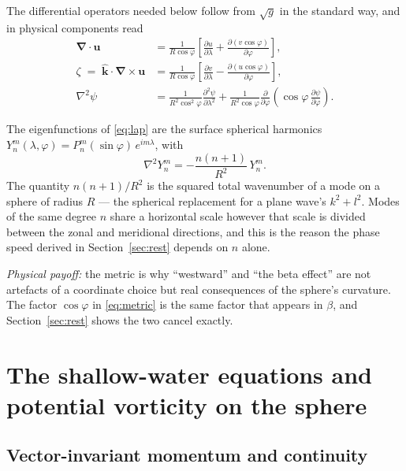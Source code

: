 \documentclass[11pt,a4paper]{article}
\newcommand{\uvec}{\boldsymbol{u}}
\newcommand{\kvec}{\hat{\boldsymbol{k}}}
\newcommand{\grad}{\boldsymbol{\nabla}}
\begin{document}
The differential operators needed below follow from $\sqrt{g}$ in the standard
way, and in physical components read
%
\begin{align}
\grad\!\cdot\uvec &= \frac{1}{R\cos\varphi}
   \left[\frac{\partial u}{\partial\lambda}
       + \frac{\partial (v\cos\varphi)}{\partial\varphi}\right],
\label{eq:div}\\[2pt]
\zeta \;=\; \kvec\cdot\grad\!\times\uvec &= \frac{1}{R\cos\varphi}
   \left[\frac{\partial v}{\partial\lambda}
       - \frac{\partial (u\cos\varphi)}{\partial\varphi}\right],
\label{eq:curl}\\[2pt]
\nabla^2 \psi &= \frac{1}{R^2\cos^2\!\varphi}
      \frac{\partial^2\psi}{\partial\lambda^2}
   + \frac{1}{R^2\cos\varphi}\frac{\partial}{\partial\varphi}
     \left(\cos\varphi\,\frac{\partial\psi}{\partial\varphi}\right).
\label{eq:lap}
\end{align}

The eigenfunctions of \eqref{eq:lap} are the surface spherical harmonics
$Y_n^m(\lambda,\varphi) = P_n^m(\sin\varphi)\,e^{i m\lambda}$, with
%
\begin{equation}
\nabla^2 Y_n^m = -\frac{n(n+1)}{R^2}\, Y_n^m .
\label{eq:lapeig}
\end{equation}
%
The quantity $n(n+1)/R^2$ is the squared total wavenumber of a mode on a sphere
of radius $R$ --- the spherical replacement for a plane wave's $k^2 + l^2$. Modes
of the same degree $n$ share a horizontal scale however that scale is divided
between the zonal and meridional directions, and this is the reason the phase
speed derived in Section~\ref{sec:rest} depends on $n$ alone.

\medskip
\noindent\emph{Physical payoff:} the metric is why ``westward'' and ``the beta
effect'' are not artefacts of a coordinate choice but real consequences of the
sphere's curvature. The factor $\cos\varphi$ in \eqref{eq:metric} is the same
factor that appears in $\beta$, and Section~\ref{sec:rest} shows the two cancel
exactly.

\section{The shallow-water equations and potential vorticity on the sphere}
\label{sec:swe}

\subsection{Vector-invariant momentum and continuity}
\end{document}
